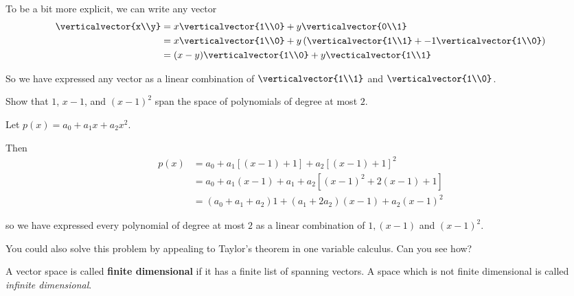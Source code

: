 \begin{Basis and Dimension}
\begin{free-response}
	 To be a bit more explicit, we can write any vector \begin{align*}
	 \verticalvector{x\\y} &= x\verticalvector{1\\0}+ y\verticalvector{0\\1}\\
	 &= x\verticalvector{1\\0}+ y\left(\verticalvector{1\\1} +-1\verticalvector{1\\0}\right)\\
	 &=(x-y)\verticalvector{1\\0}+y\vecticalvector{1\\1}
	 \end{align*}
	 
	 So we have expressed any vector as a linear combination of $\verticalvector{1\\1}$ and $\verticalvector{1\\0}$.
\end{free-response} 

 
 	Show that $1$, $x-1$, and $(x-1)^2$  span the space of polynomials of degree at most $2$.

\begin{free-response}
	Let $p(x)=a_0+a_1x+a_2x^2$. 
	
	Then \begin{align*}
		p(x) &= a_0+a_1[(x-1)+1]+a_2[(x-1)+1]^2\\
			   &= a_0+a_1(x-1)+a_1+a_2[(x-1)^2+2(x-1)+1]\\
			   &= (a_0+a_1+a_2)1+(a_1+2a_2)(x-1)+a_2(x-1)^2
		\end{align*}
	
	so we have expressed every polynomial of degree at most $2$ as a linear combination of $1,(x-1)$ and $(x-1)^2$.
	
	You could also solve this problem by appealing to Taylor's theorem in one variable calculus.  Can you see how?
\end{free-response}

 
  \begin{definition}
 	A vector space is called \textbf{finite dimensional} if it has a finite list of spanning vectors.  A space which is not finite dimensional is called \textit{infinite dimensional}.
 \end{definition}
 

\end{Basis and Dimension}
